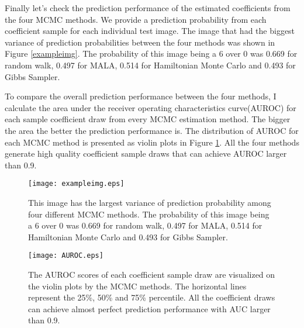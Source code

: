 \documentclass[12pt]{article}
\begin{document}
Finally let's check the prediction performance of the estimated coefficients from the four MCMC methods. We provide a prediction probability from each coefficient sample for each individual test image. The image that had the biggest variance of prediction probabilities between the four methods was shown in Figure \ref{exampleimg}. The probability of this image being a 6 over 0 was 0.669 for random walk, 0.497 for MALA, 0.514 for Hamiltonian Monte Carlo and 0.493 for Gibbs Sampler.

To compare the overall prediction performance between the four methods, I calculate the area under the receiver operating characteristics curve(AUROC) for each sample coefficient draw from every MCMC estimation method. The bigger the area the better the prediction performance is. The distribution of AUROC for each MCMC method is presented as violin plots in Figure \ref{auroc}. All the four methods generate high quality coefficient sample draws that can achieve AUROC larger than 0.9.

\begin{figure}[htbp]
	\centering
	\texttt{[image: exampleimg.eps]}
	\caption{This image has the largest variance of prediction probability among four different MCMC methods. The probability of this image being a 6 over 0 was 0.669 for random walk, 0.497 for MALA, 0.514 for Hamiltonian Monte Carlo and 0.493 for Gibbs Sampler.}\label{exampleimg}
	\texttt{[image: AUROC.eps]}
	\caption{The AUROC scores of each coefficient sample draw are visualized on the violin plots by the MCMC methods. The horizontal lines represent the 25\%, 50\% and 75\% percentile. All the coefficient draws can achieve almost perfect prediction performance with AUC larger than 0.9.}\label{auroc}
\end{figure}






\end{document}
